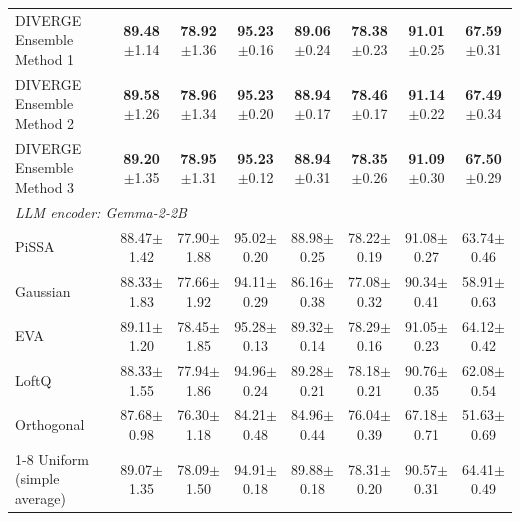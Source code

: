 \documentclass[a4paper,fleqn]{cas-sc}
\begin{document}
\begin{table}[htbp]
\begin{tabular*}{\textwidth}{@{\extracolsep{\fill}} lccccccc @{}}
DIVERGE Ensemble Method 1 & \textbf{89.48}{\scriptsize$\pm$1.14} & \textbf{78.92}{\scriptsize$\pm$1.36} & \textbf{95.23}{\scriptsize$\pm$0.16} & \textbf{89.06}{\scriptsize$\pm$0.24} & \textbf{78.38}{\scriptsize$\pm$0.23} & \textbf{91.01}{\scriptsize$\pm$0.25} & \textbf{67.59}{\scriptsize$\pm$0.31} \\
DIVERGE Ensemble Method 2 & \textbf{89.58}{\scriptsize$\pm$1.26} & \textbf{78.96}{\scriptsize$\pm$1.34} & \textbf{95.23}{\scriptsize$\pm$0.20} & \textbf{88.94}{\scriptsize$\pm$0.17} & \textbf{78.46}{\scriptsize$\pm$0.17} & \textbf{91.14}{\scriptsize$\pm$0.22} & \textbf{67.49}{\scriptsize$\pm$0.34} \\
DIVERGE Ensemble Method 3 & \textbf{89.20}{\scriptsize$\pm$1.35} & \textbf{78.95}{\scriptsize$\pm$1.31} & \textbf{95.23}{\scriptsize$\pm$0.12} & \textbf{88.94}{\scriptsize$\pm$0.31} & \textbf{78.35}{\scriptsize$\pm$0.26} & \textbf{91.09}{\scriptsize$\pm$0.30} & \textbf{67.50}{\scriptsize$\pm$0.29} \\
\midrule
\multicolumn{8}{l}{\textit{LLM encoder: Gemma-2-2B}} \\
\midrule
PiSSA                     & 88.47{\scriptsize$\pm$1.42} & 77.90{\scriptsize$\pm$1.88} & 95.02{\scriptsize$\pm$0.20} & 88.98{\scriptsize$\pm$0.25} & 78.22{\scriptsize$\pm$0.19} & 91.08{\scriptsize$\pm$0.27} & 63.74{\scriptsize$\pm$0.46} \\
Gaussian                  & 88.33{\scriptsize$\pm$1.83} & 77.66{\scriptsize$\pm$1.92} & 94.11{\scriptsize$\pm$0.29} & 86.16{\scriptsize$\pm$0.38} & 77.08{\scriptsize$\pm$0.32} & 90.34{\scriptsize$\pm$0.41} & 58.91{\scriptsize$\pm$0.63} \\
EVA                       & 89.11{\scriptsize$\pm$1.20} & 78.45{\scriptsize$\pm$1.85} & 95.28{\scriptsize$\pm$0.13} & 89.32{\scriptsize$\pm$0.14} & 78.29{\scriptsize$\pm$0.16} & 91.05{\scriptsize$\pm$0.23} & 64.12{\scriptsize$\pm$0.42} \\
LoftQ                     & 88.33{\scriptsize$\pm$1.55} & 77.94{\scriptsize$\pm$1.86} & 94.96{\scriptsize$\pm$0.24} & 89.28{\scriptsize$\pm$0.21} & 78.18{\scriptsize$\pm$0.21} & 90.76{\scriptsize$\pm$0.35} & 62.08{\scriptsize$\pm$0.54} \\
Orthogonal                & 87.68{\scriptsize$\pm$0.98} & 76.30{\scriptsize$\pm$1.18} & 84.21{\scriptsize$\pm$0.48} & 84.96{\scriptsize$\pm$0.44} & 76.04{\scriptsize$\pm$0.39} & 67.18{\scriptsize$\pm$0.71} & 51.63{\scriptsize$\pm$0.69} \\
\cmidrule(lr){1-8}
Uniform (simple average)  & 89.07{\scriptsize$\pm$1.35} & 78.09{\scriptsize$\pm$1.50} & 94.91{\scriptsize$\pm$0.18} & 89.88{\scriptsize$\pm$0.18} & 78.31{\scriptsize$\pm$0.20} & 90.57{\scriptsize$\pm$0.31} & 64.41{\scriptsize$\pm$0.49} \\

\end{tabular*}
\end{table}
\end{document}
